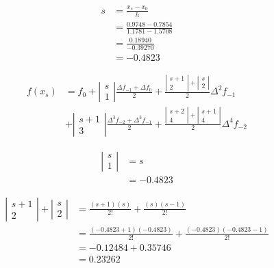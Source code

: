 \begin{align*}
    s &= \frac{x_s - x_0}{h} \\
    &= \frac{0.9748 - 0.7854}{1.1781 - 1.5708} \\
    &= \frac{0.18940}{-0.39270} \\
    &= -0.4823
\end{align*}

\begin{align*}
f(x_s) &= f_0 +
    \left| \begin{array}{c} s \\ 1 \end{array} \right|
    \frac{\Delta f_{-1} + \Delta f_0}{2}
    + \frac{
        \left| \begin{array}{c} s + 1 \\ 2 \end{array} \right|
        + \left| \begin{array}{c} s \\ 2 \end{array} \right|
        }{2} \Delta^2 f_{-1} \\
&+ \left| \begin{array}{c} s + 1 \\ 3 \end{array} \right|
    \frac{\Delta^3 f_{-2} + \Delta^3 f_{-1}}{2}
    + \frac{
        \left| \begin{array}{c} s + 2 \\ 4 \end{array} \right|
        + \left| \begin{array}{c} s + 1 \\ 4 \end{array} \right|
        }{2} \Delta^4 f_{-2}
\end{align*}

\begin{align*}
\left| \begin{array}{c} s \\ 1 \end{array} \right| &= s \\
        &= -0.4823
\end{align*}

\begin{align*}
\left| \begin{array}{c} s + 1 \\ 2 \end{array} \right| + \left| \begin{array}{c} s \\ 2 \end{array} \right| &= \frac{(s+1)(s)}{2 !} + \frac{(s)(s-1)}{2 !} \\
    &= \frac{(-0.4823+1)(-0.4823)}{2 !} + \frac{(-0.4823)(-0.4823-1)}{2 !} \\
    &= -0.12484 + 0.35746 \\
    &= 0.23262
\end{align*}

